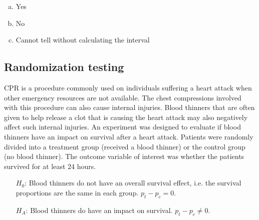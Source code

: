 \documentclass[11pt,containsverbatim,handout,xcolor=xelatex,dvipsnames,table]{beamer}
\newcommand{\solnMult}[1]{#1}
\begin{document}

\begin{frame}


\begin{enumerate}[(a)]
\item Yes
\item No
\item \solnMult{Cannot tell without calculating the interval}
\end{enumerate}

\end{frame}


\subsection{Randomization testing}


\begin{frame}

{\small CPR is a procedure commonly used on individuals suffering a heart attack when other emergency resources are not available. The chest compressions involved with this procedure can also cause internal injuries. Blood thinners that are often given to help release a clot that is causing the heart attack may also negatively affect such internal injuries. An experiment was designed to evaluate if blood thinners have an impact on survival after a heart attack. Patients were randomly divided into a treatment group (received a blood thinner) or the control group (no blood thinner). The outcome variable of interest was whether the patients survived for at least 24 hours.}

\end{frame}


\begin{frame}


\begin{itemize}
\item[$H_0$:] Blood thinners do not have an overall survival effect, i.e. the survival proportions are the same in each group. $p_t - p_c = 0$.
\item[$H_A$:] Blood thinners do have an impact on survival. $p_t - p_c \neq 0$.
\end{itemize}

\end{frame}
\end{document}

